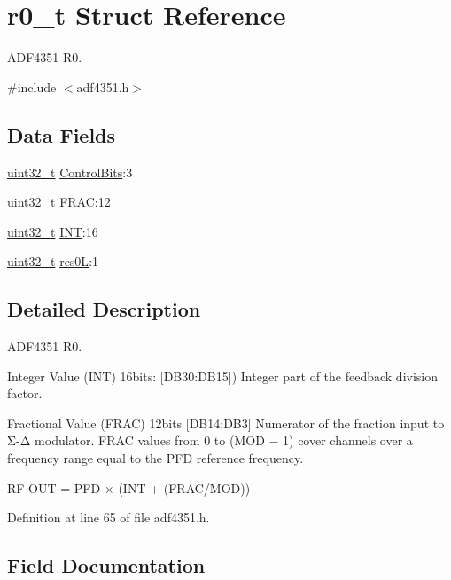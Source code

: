 \hypertarget{structr0__t}{}\section{r0\+\_\+t Struct Reference}
\label{structr0__t}


A\+D\+F4351 R0.  




{\ttfamily \#include $<$adf4351.\+h$>$}

\subsection*{Data Fields}
\begin{DoxyCompactItemize}
\item 
\hyperlink{send_8c_a435d1572bf3f880d55459d9805097f62}{uint32\+\_\+t} \hyperlink{structr0__t_aad2911768ed7dd38e899b81d517dda08}{Control\+Bits}\+:3
\item 
\hyperlink{send_8c_a435d1572bf3f880d55459d9805097f62}{uint32\+\_\+t} \hyperlink{structr0__t_adc22c0b86ef296065f01c8800d4f5d52}{F\+R\+AC}\+:12
\item 
\hyperlink{send_8c_a435d1572bf3f880d55459d9805097f62}{uint32\+\_\+t} \hyperlink{structr0__t_a1d7f06769cdf259c9858033cb164e31d}{I\+NT}\+:16
\item 
\hyperlink{send_8c_a435d1572bf3f880d55459d9805097f62}{uint32\+\_\+t} \hyperlink{structr0__t_ab7402e75c2a633ce378078407151341d}{res0L}\+:1
\end{DoxyCompactItemize}


\subsection{Detailed Description}
A\+D\+F4351 R0. 

Integer Value (I\+NT) 16bits\+: \mbox{[}D\+B30\+:D\+B15\mbox{]}) Integer part of the feedback division factor.

Fractional Value (F\+R\+AC) 12bits \mbox{[}D\+B14\+:D\+B3\mbox{]} Numerator of the fraction input to Σ-\/Δ modulator. F\+R\+AC values from 0 to (M\+OD − 1) cover channels over a frequency range equal to the P\+FD reference frequency.

RF O\+UT = P\+FD × (I\+NT + (F\+R\+A\+C/\+M\+OD)) 

Definition at line 65 of file adf4351.\+h.



\subsection{Field Documentation}
